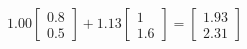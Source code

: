 \documentclass[preview]{standalone}
\begin{document}
\begin{align*}
1.00 \begin{bmatrix} 0.8 \\ 0.5 \end{bmatrix} + 1.13 \begin{bmatrix} 1 \\ 1.6 \end{bmatrix} = \begin{bmatrix} 1.93 \\ 2.31 \end{bmatrix}
\end{align*}
\end{document}
